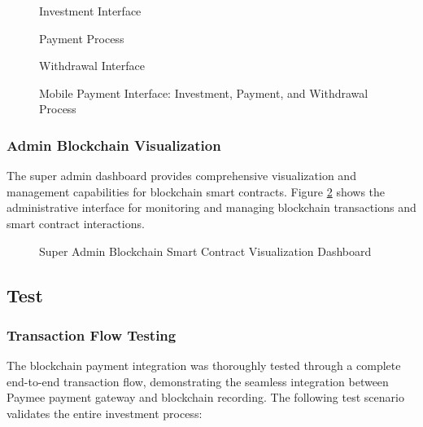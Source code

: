 \begin{figure}[htbp]
    \centering
    \begin{minipage}{0.32\textwidth}
        \centering
        \caption*{Investment Interface}
    \end{minipage}
    \hfill
    \begin{minipage}{0.32\textwidth}
        \centering
        \caption*{Payment Process}
    \end{minipage}
    \hfill
    \begin{minipage}{0.32\textwidth}
        \centering
        \caption*{Withdrawal Interface}
    \end{minipage}
    \caption{Mobile Payment Interface: Investment, Payment, and Withdrawal Process}
    \label{fig:mobile-payment-interface}
\end{figure}

\subsubsection*{Admin Blockchain Visualization}

The super admin dashboard provides comprehensive visualization and management capabilities for blockchain smart contracts. Figure \ref{fig:admin-blockchain-visualization} shows the administrative interface for monitoring and managing blockchain transactions and smart contract interactions.

\begin{figure}[htbp]
    \centering
    \caption{Super Admin Blockchain Smart Contract Visualization Dashboard}
    \label{fig:admin-blockchain-visualization}
\end{figure}

\subsection{Test}
\subsubsection{Transaction Flow Testing}

The blockchain payment integration was thoroughly tested through a complete end-to-end transaction flow, demonstrating the seamless integration between Paymee payment gateway and blockchain recording. The following test scenario validates the entire investment process:

